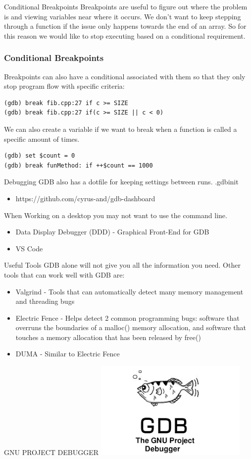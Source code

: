\documentclass[11pt]{beamer}
\begin{document}
\begin{frame}{Conditional Breakpoints}
        Breakpoints are useful to figure out where the problem is and viewing variables near where it occurs. 
        \break
        \break
        We don't want to keep stepping through a function if the issue only happens towards the end of an array. 
        \break
        \break
        So for this reason we would like to stop executing based on a conditional requirement.
\end{frame}

\begin{frame}[fragile]
\frametitle{Conditional Breakpoints}
Breakpoints can also have a conditional associated with them so that they only stop program flow with specific criteria:
\begin{lstlisting}[style=BashInputStyle]
(gdb) break fib.cpp:27 if c >= SIZE
(gdb) break fib.cpp:27 if(c >= SIZE || c < 0)
\end{lstlisting}
We can also create a variable if we want to break when a function is called a specific amount of times.
\begin{lstlisting}[style=BashInputStyle]
(gdb) set $count = 0
(gdb) break funMethod: if ++$count == 1000
\end{lstlisting}
\end{frame}


\begin{frame}{Debugging}
GDB also has a dotfile for keeping settings between runs. .gdbinit
\begin{itemize}
\item https://github.com/cyrus-and/gdb-dashboard
\end{itemize}
When Working on a desktop you may not want to use the command line.
\begin{itemize}
\item Data Display Debugger (DDD) - Graphical Front-End for GDB
\item VS Code
\end{itemize}
\end{frame}

\begin{frame}{Useful Tools}
GDB alone will not give you all the information you need. Other tools that can work well with GDB are:
\begin{itemize}
\item Valgrind - Tools that can automatically detect many memory management and threading bugs
\item Electric Fence - Helps detect 2 common programming bugs: software that overruns the boundaries of a malloc() memory allocation, and software that touches a memory allocation that has been released by free()
\item DUMA - Similar to Electric Fence
\end{itemize}
\end{frame}

\begin{frame}{GNU PROJECT DEBUGGER}
\includegraphics{src/gdb_logo.png}
\end{frame}
\end{document}
